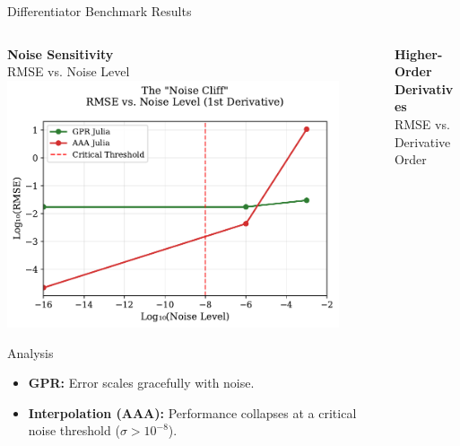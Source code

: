\documentclass[aspectratio=169]{beamer}
\begin{document}
\begin{frame}{Differentiator Benchmark Results}
    \begin{columns}[T]
        \begin{column}{0.48\textwidth}
            \centering
            \textbf{Noise Sensitivity}\\
            \small{RMSE vs. Noise Level}
            \vspace{0.5em}
            \includegraphics[width=0.9\textwidth]{noise_cliff.pdf}
            \vspace{0.5em}
            \begin{block}{\tiny Analysis}
            \begin{itemize}
                \item \textbf{GPR:} Error scales gracefully with noise.
                \item \textbf{Interpolation (AAA):} Performance collapses at a critical noise threshold ($\sigma > 10^{-8}$).
            \end{itemize}
            \end{block}
        \end{column}
        \begin{column}{0.48\textwidth}
            \centering
            \textbf{Higher-Order Derivatives}\\
            \small{RMSE vs. Derivative Order}
            \vspace{0.5em}

\end{column}
\end{columns}
\end{frame}
\end{document}
